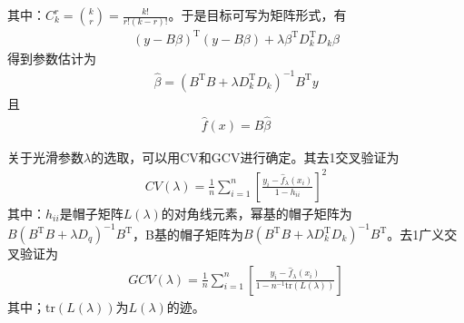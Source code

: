             其中：$C_k^r = \binom{k}{r} = \frac{k!}{r!(k-r)!}$。于是目标可写为矩阵形式，有
            \begin{align*}
            (y - B\beta)^\mathrm{T}(y - B\beta) + \lambda \beta^\mathrm{T}D_k^\mathrm{T}D_k\beta
            \end{align*}
            得到参数估计为
            \begin{align*}
            \hat{\beta} = (B^\mathrm{T}B+\lambda D_k^\mathrm{T}D_k)^{-1}B^\mathrm{T}y
            \end{align*}
            且
            \begin{align*}
            \hat{f}(x) = B\hat{\beta}
            \end{align*}
            \par
            关于光滑参数$\lambda$的选取，可以用CV和GCV进行确定。其去1交叉验证为
            \begin{align*}
            CV(\lambda) = \frac{1}{n}\sum_{i=1}^n\left[ \frac{y_i - \hat{f}_\lambda(x_i)}{1-h_{ii}}  \right]^2
            \end{align*}
            其中：$h_{ii}$是帽子矩阵$L(\lambda)$的对角线元素，幂基的帽子矩阵为$B(B^\mathrm{T}B+\lambda D_q)^{-1}B^\mathrm{T}$，B基的帽子矩阵为$B(B^\mathrm{T}B+\lambda D_k^\mathrm{T}D_k)^{-1}B^\mathrm{T}$。去1广义交叉验证为
            \begin{align*}
            GCV(\lambda) = \frac{1}{n}\sum_{i=1}^n\left[ \frac{y_i - \hat{f}_\lambda(x_i)}{1-n^{-1}\mathrm{tr}(L(\lambda))}  \right]
            \end{align*}
            其中；$\mathrm{tr}(L(\lambda))$为$L(\lambda)$的迹。

